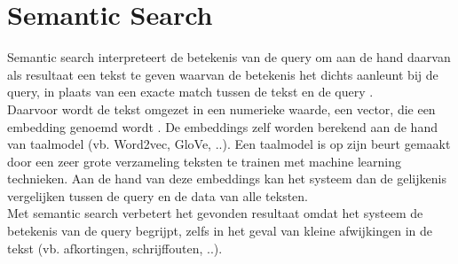\section{Semantic Search}
Semantic search interpreteert de betekenis van de query om aan de hand daarvan als resultaat een tekst te geven waarvan de betekenis het dichts aanleunt bij de query, in plaats van een exacte match tussen de tekst en de query \autocite{Bast2016}.\\
Daarvoor wordt de tekst omgezet in een numerieke waarde, een vector, die een embedding genoemd wordt
\autocite{Almeida2019}. De embeddings zelf worden berekend aan de hand van taalmodel (vb. Word2vec, GloVe, ..). Een taalmodel is op zijn beurt gemaakt door een zeer grote verzameling teksten te trainen met machine learning technieken. Aan de hand van deze embeddings kan het systeem dan de gelijkenis vergelijken tussen de query en de data van alle teksten.\\
Met semantic search verbetert het gevonden resultaat omdat het systeem de betekenis van de query begrijpt, zelfs in het geval van kleine afwijkingen in de tekst (vb. afkortingen, schrijffouten, ..). 




